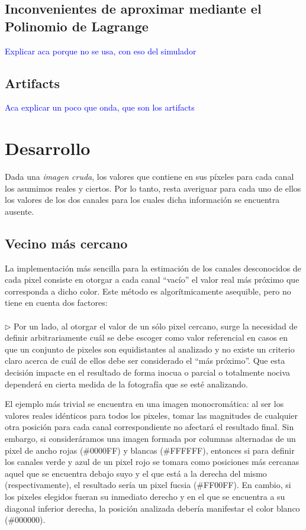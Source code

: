 \documentclass[a4paper]{article}
\begin{document}
\subsection{Inconvenientes de aproximar mediante el Polinomio de Lagrange}

\textcolor{blue}{Explicar aca porque no se usa, con eso del simulador}

\subsection{Artifacts}
\textcolor{blue}{Aca explicar un poco que onda,  que son los artifacts}

\newpage
\section{Desarrollo}

Dada una \textit{imagen cruda}, los valores que contiene en sus píxeles para cada canal los asumimos reales y ciertos. Por lo tanto, resta averiguar para cada uno de ellos los valores de los dos canales para los cuales dicha información se encuentra ausente.

\subsection{Vecino m\'as cercano}
La implementación más sencilla para la estimación de los canales desconocidos de cada pixel consiste en otorgar a cada canal ``vacío'' el valor real m\'as pr\'oximo que corresponda a dicho color. Este m\'etodo es algor\'itmicamente asequible, pero no tiene en cuenta dos factores: \\
\\

$\triangleright$ Por un lado, al otorgar el valor de un sólo pixel cercano, surge la necesidad de definir arbitrariamente cuál se debe escoger como valor referencial en casos en que un conjunto de pixeles son equidistantes al analizado y no existe un criterio claro acerca de cuál de ellos debe ser considerado el ``más próximo''. Que esta decisión impacte en el resultado de forma inocua o parcial o totalmente nociva dependerá en cierta medida de la fotografía que se esté analizando.

El ejemplo más trivial se encuentra en una imagen monocromática: al ser los valores reales idénticos para todos los pixeles, tomar las magnitudes de cualquier otra posición para cada canal correspondiente no afectará el resultado final. Sin embargo, si consideráramos una imagen formada por columnas alternadas de un pixel de ancho rojas (\#0000FF) y blancas (\#FFFFFF), entonces si para definir los canales verde y azul de un pixel rojo se tomara como posiciones más cercanas aquel que se encuentra debajo suyo y el que está a la derecha del mismo (respectivamente), el resultado sería un pixel fucsia (\#FF00FF). En cambio, si los pixeles elegidos fueran su inmediato derecho y en el que se encuentra a su diagonal inferior derecha, la posición analizada debería manifestar el color blanco (\#000000).
\end{document}
